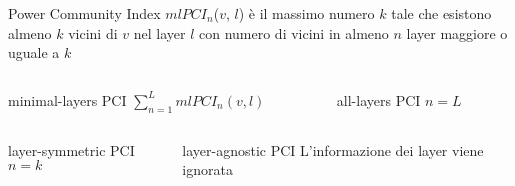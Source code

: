 \begin{frame}
    \begin{block}{Power Community Index}
        $\mathit{mlPCI}_n$($v$, $l$) è il massimo numero $k$ tale che esistono almeno 
        $k$ vicini di $v$ nel layer $l$ con numero di vicini in almeno $n$ layer maggiore o uguale a $k$
    \end{block}
    \begin{columns}
        \begin{column}{0.4\textwidth}
            \begin{block}{minimal-layers PCI}
                $\sum_{n=1}^L \mathit{mlPCI}_n(v, l)$
            \end{block}
        \end{column}
        \begin{column}{0.4\textwidth}
            \begin{block}{all-layers PCI}
                $n = L$
            \end{block}
        \end{column}
    \end{columns}  
    \begin{columns}
        \begin{column}{0.4\textwidth}
            \begin{block}{layer-symmetric PCI}
                $n = k$
            \end{block}
        \end{column}
        \begin{column}{0.4\textwidth}
            \begin{block}{layer-agnostic PCI}
                L'informazione dei layer viene ignorata
            \end{block}
        \end{column}
    \end{columns}    
    

    

    



    

\end{frame}